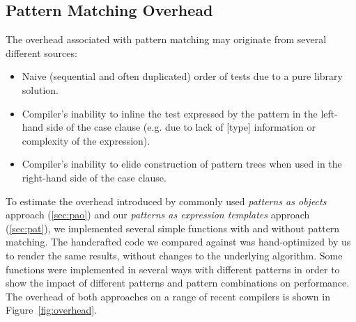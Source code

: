\subsection{Pattern Matching Overhead}
\label{sec:patcmp}

The overhead associated with pattern matching may originate from several 
different sources:

\begin{itemize}
\setlength{\itemsep}{0pt}
\setlength{\parskip}{0pt}
\item Naive (sequential and often duplicated) order of tests due to a pure 
      library solution. 
\item Compiler's inability to inline the test expressed by the pattern in the 
      left-hand side of the case clause (e.g. due to lack of [type] information 
      or complexity of the expression). 
\item Compiler's inability to elide construction of pattern trees when used in 
      the right-hand side of the case clause.
\end{itemize}

\noindent
To estimate the overhead introduced by commonly used \emph{patterns as objects} 
approach (\textsection\ref{sec:pao}) and our \emph{patterns as expression 
templates} approach (\textsection\ref{sec:pat}), we implemented several simple
functions with and without pattern matching. The handcrafted code we compared 
against was hand-optimized by us to render the same results, without changes to 
the underlying algorithm. Some functions were implemented in several ways with 
different patterns in order to show the impact of different patterns and pattern 
combinations on performance. The overhead of both approaches on a range of 
recent \Cpp{} compilers is shown in Figure~\ref{fig:overhead}.

